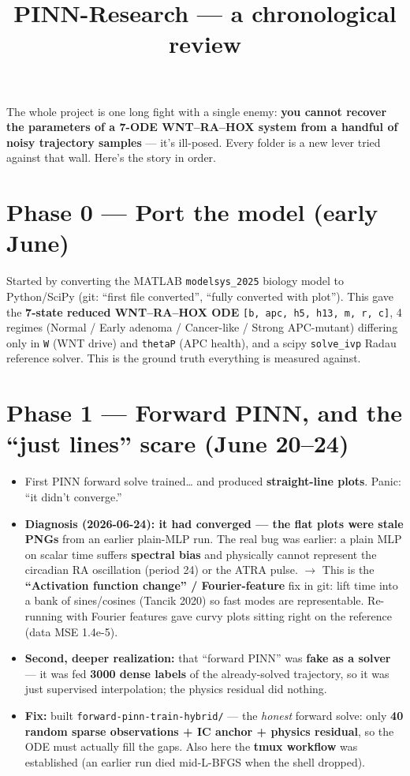 \documentclass[11pt]{article}
\title{\vspace{-1.5em}\textbf{PINN-Research --- a chronological review}}
\author{}
\date{}
\newcommand{\code}[1]{\texttt{\textcolor{codegray}{#1}}}
\begin{document}
\maketitle
\vspace{-2.5em}

The whole project is one long fight with a single enemy: \textbf{you cannot recover the parameters of a 7-ODE WNT--RA--HOX system from a handful of noisy trajectory samples} --- it's ill-posed. Every folder is a new lever tried against that wall. Here's the story in order.

\section*{Phase 0 --- Port the model (early June)}
Started by converting the MATLAB \code{modelsys\_2025} biology model to Python/SciPy (git: ``first file converted'', ``fully converted with plot''). This gave the \textbf{7-state reduced WNT--RA--HOX ODE} \code{[b, apc, h5, h13, m, r, c]}, 4 regimes (Normal / Early adenoma / Cancer-like / Strong APC-mutant) differing only in \code{W} (WNT drive) and \code{thetaP} (APC health), and a scipy \code{solve\_ivp} Radau reference solver. This is the ground truth everything is measured against.

\section*{Phase 1 --- Forward PINN, and the ``just lines'' scare (June 20--24)}
\begin{itemize}
\item First PINN forward solve trained\ldots{} and produced \textbf{straight-line plots}. Panic: ``it didn't converge.''
\item \textbf{Diagnosis (2026-06-24): it had converged --- the flat plots were stale PNGs} from an earlier plain-MLP run. The real bug was earlier: a plain MLP on scalar time suffers \textbf{spectral bias} and physically cannot represent the circadian RA oscillation (period 24) or the ATRA pulse. $\rightarrow$ This is the \textbf{``Activation function change'' / Fourier-feature} fix in git: lift time into a bank of sines/cosines (Tancik 2020) so fast modes are representable. Re-running with Fourier features gave curvy plots sitting right on the reference (data MSE 1.4e-5).
\item \textbf{Second, deeper realization:} that ``forward PINN'' was \textbf{fake as a solver} --- it was fed \textbf{3000 dense labels} of the already-solved trajectory, so it was just supervised interpolation; the physics residual did nothing.
\item \textbf{Fix:} built \code{forward-pinn-train-hybrid/} --- the \textit{honest} forward solve: only \textbf{40 random sparse observations + IC anchor + physics residual}, so the ODE must actually fill the gaps. Also here the \textbf{tmux workflow} was established (an earlier run died mid-L-BFGS when the shell dropped).
\end{itemize}
\end{document}
